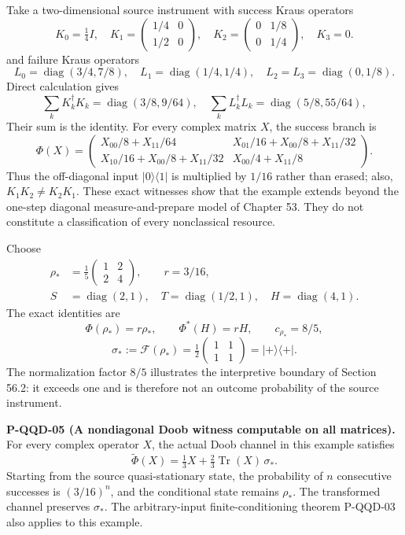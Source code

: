 \documentclass[
  11pt,
  oneside]{book}
\begin{document}
Take a two-dimensional source instrument with success Kraus operators \[
K_0=\tfrac14I,\quad
K_1=\begin{pmatrix}1/4&0\\1/2&0\end{pmatrix},\quad
K_2=\begin{pmatrix}0&1/8\\0&1/4\end{pmatrix},\quad K_3=0.
\] and failure Kraus operators \[
L_0=\operatorname{diag}(3/4,7/8),\quad
L_1=\operatorname{diag}(1/4,1/4),\quad
L_2=L_3=\operatorname{diag}(0,1/8).
\] Direct calculation gives \[
\sum_kK_k^\dagger K_k=\operatorname{diag}(3/8,9/64),
\quad \sum_kL_k^\dagger L_k=\operatorname{diag}(5/8,55/64),
\] Their sum is the identity. For every complex matrix \(X\), the
success branch is \[
\Phi(X)=\begin{pmatrix}
X_{00}/8+X_{11}/64&X_{01}/16+X_{00}/8+X_{11}/32\\
X_{10}/16+X_{00}/8+X_{11}/32&X_{00}/4+X_{11}/8
\end{pmatrix}.
\] Thus the off-diagonal input \(|0\rangle\langle1|\) is multiplied by
\(1/16\) rather than erased; also, \(K_1K_2\ne K_2K_1\). These exact
witnesses show that the example extends beyond the one-step diagonal
measure-and-prepare model of Chapter 53. They do not constitute a
classification of every nonclassical resource.

Choose \[
\begin{aligned}
\rho_* &=\tfrac15\begin{pmatrix}1&2\\2&4\end{pmatrix},\qquad r=3/16,\\
S&=\operatorname{diag}(2,1),\quad T=\operatorname{diag}(1/2,1),\quad H=\operatorname{diag}(4,1).
\end{aligned}
\] The exact identities are \[
\Phi(\rho_*)=r\rho_*,\qquad \Phi^*(H)=rH,\qquad
c_{\rho_*}=8/5,
\] \[
\sigma_*:=\mathcal F(\rho_*)=\tfrac12\begin{pmatrix}1&1\\1&1\end{pmatrix}
=|+\rangle\langle+|.
\] The normalization factor \(8/5\) illustrates the interpretive
boundary of Section 56.2: it exceeds one and is therefore not an outcome
probability of the source instrument.

\label{p-qqd-05}{}

\textbf{P-QQD-05 (A nondiagonal Doob witness computable on all
matrices).} For every complex operator \(X\), the actual Doob channel in
this example satisfies \[
\widetilde\Phi(X)=\tfrac13X+\tfrac23\operatorname{Tr}(X)\,\sigma_*.
\] Starting from the source quasi-stationary state, the probability of
\(n\) consecutive successes is \((3/16)^n\), and the conditional state
remains \(\rho_*\). The transformed channel preserves \(\sigma_*\). The
arbitrary-input finite-conditioning theorem P-QQD-03 also applies to
this example.
\end{document}
